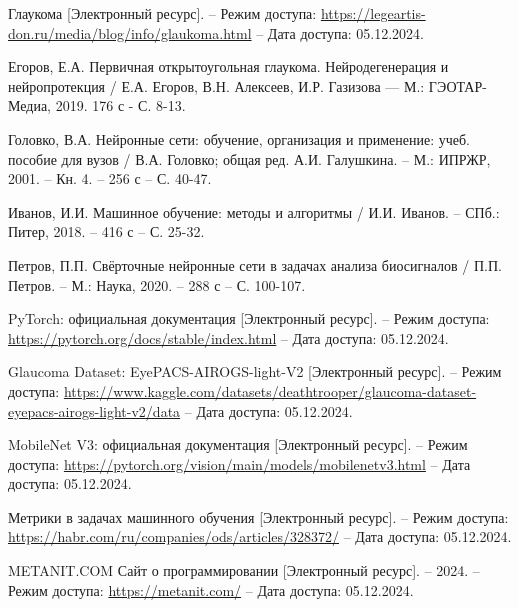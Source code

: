 {    
    
    \newpage
    
\begin{thebibliography}{99}
    Глаукома [Электронный ресурс]. – Режим доступа: \url{https://legeartis-don.ru/media/blog/info/glaukoma.html} – Дата доступа: 05.12.2024.

    Егоров, Е.А. Первичная открытоугольная глаукома. Нейродегенерация и нейропротекция / Е.А. Егоров, В.Н. Алексеев, И.Р. Газизова — М.: ГЭОТАР-Медиа, 2019. 176 с - С. 8-13.
    
    Головко, В.А. Нейронные сети: обучение, организация и применение: учеб. пособие для вузов / В.А. Головко; общая ред. А.И. Галушкина. – М.: ИПРЖР, 2001. – Кн. 4. – 256 с – С. 40-47.
    
    Иванов, И.И. Машинное обучение: методы и алгоритмы / И.И. Иванов. – СПб.: Питер, 2018. – 416 с – С. 25-32.

    Петров, П.П. Свёрточные нейронные сети в задачах анализа биосигналов / П.П. Петров. – М.: Наука, 2020. – 288 с – С. 100-107.
    
    PyTorch: официальная документация [Электронный ресурс]. – Режим доступа: \url{https://pytorch.org/docs/stable/index.html} – Дата доступа: 05.12.2024.
    
    Glaucoma Dataset: EyePACS-AIROGS-light-V2 [Электронный ресурс]. – Режим доступа: \url{https://www.kaggle.com/datasets/deathtrooper/glaucoma-dataset-eyepacs-airogs-light-v2/data} – Дата доступа: 05.12.2024.

    MobileNet V3: официальная документация [Электронный ресурс]. – Режим доступа: \url{https://pytorch.org/vision/main/models/mobilenetv3.html} – Дата доступа: 05.12.2024.
    
    Метрики в задачах машинного обучения [Электронный ресурс]. – Режим доступа: \url{https://habr.com/ru/companies/ods/articles/328372/} – Дата доступа: 05.12.2024.
    
    METANIT.COM Сайт о программировании [Электронный ресурс]. – 2024. – Режим доступа: \url{https://metanit.com/} – Дата доступа: 05.12.2024.

    \end{thebibliography}

}


